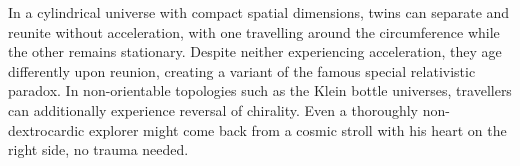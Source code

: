 In a cylindrical universe with compact spatial dimensions, twins can separate and reunite without acceleration, with one travelling around the circumference while the other remains stationary. Despite neither experiencing acceleration, they age differently upon reunion, creating a variant of the famous special relativistic paradox. In non-orientable topologies such as the Klein bottle universes, travellers can additionally experience reversal of chirality. Even a thoroughly non-dextrocardic explorer might come back from a cosmic stroll with his heart on the right side, no trauma needed.

